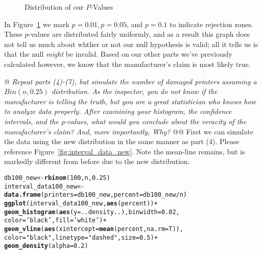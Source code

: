 \documentclass[10pt]{report}\usepackage[]{graphicx}\usepackage[]{xcolor}
\makeatletter
\newcommand{\hlnum}[1]{\textcolor[rgb]{0.686,0.059,0.569}{#1} }%
\newcommand{\hlstr}[1]{\textcolor[rgb]{0.192,0.494,0.8}{#1} }%
\newcommand{\hlopt}[1]{\textcolor[rgb]{0,0,0}{#1} }%
\newcommand{\hlstd}[1]{\textcolor[rgb]{0.345,0.345,0.345}{#1} }%
\newcommand{\hlkwb}[1]{\textcolor[rgb]{0.69,0.353,0.396}{#1} }%
\newcommand{\hlkwc}[1]{\textcolor[rgb]{0.333,0.667,0.333}{#1} }%
\newcommand{\hlkwd}[1]{\textcolor[rgb]{0.737,0.353,0.396}{\textbf{#1} } }%
\newenvironment{kframe}{%
 \def\at@end@of@kframe{}%
 \ifinner\ifhmode%
  \def\at@end@of@kframe{\end{minipage} }%
  \begin{minipage}{\columnwidth}%
 \fi\fi%
 \def\FrameCommand##1{\hskip\@totalleftmargin \hskip-\fboxsep
 \colorbox{shadecolor}{##1}\hskip-\fboxsep
     \hskip-\linewidth \hskip-\@totalleftmargin \hskip\columnwidth}%
 \MakeFramed {\advance\hsize-\width
   \@totalleftmargin\z@ \linewidth\hsize
   \@setminipage} }%
 {\par\unskip\endMakeFramed%
 \at@end@of@kframe}
\newenvironment{knitrout}{}{} %
\makeatother
\begin{document}
\begin{easylist}[enumerate]
\begin{knitrout}
\begin{figure}[H]
{}

\caption[Distribution of our $P$-Values]{Distribution of our $P$-Values\label{fig:pvalues} }
\end{figure}


\end{knitrout}


        In Figure~\ref{fig:pvalues} we mark $p=0.01, p=0.05$, and $p=0.1$ to indicate rejection zones. These $p$-values
        are distributed fairly uniformly, and as a result this graph does not tell us much about whther or not our null
        hypothesis is valid; all it tells us is that the null \textit{might} be invalid. Based on our other parts we've
        previously calculated however, we know that the manufacturer's claim is most likely true.

        \newpage
        @ \textit{Repeat parts (4)-(7), but simulate the number of damaged printers assuming a $Bin(n, 0.25)$
        distribution. As the inspector, you do not know if the manufacturer is telling the truth, but you are a great
        statistician who knows how to analyze data properly. After examining your histogram, the confidence intervals, and
        the p-values, what would you conclude about the veracity of the manufacturer's claim? And, more importantly,
        Why?}\newline
        @@ First we can simulate the data using the new distribution in the same manner as part (4). Please reference
        Figure~\ref{fig:interval_data_new}. Note the mean-line remains, but is markedly different from before due to the
        new distribution.

\begin{knitrout}
\color{fgcolor}\begin{kframe}
\begin{alltt}
         \hlstd{db100_new} \hlkwb{<-} \hlkwd{rbinom}\hlstd{(}\hlnum{100}\hlstd{, n,} \hlnum{0.25}\hlstd{)}
         \hlstd{interval_data100_new} \hlkwb{<-} \hlkwd{data.frame}\hlstd{(}\hlkwc{printers}\hlstd{=db100_new,} \hlkwc{percent}\hlstd{=db100_new}\hlopt{/}\hlstd{n)}
         \hlkwd{ggplot}\hlstd{(interval_data100_new,} \hlkwd{aes}\hlstd{(percent))} \hlopt{+}
                    \hlkwd{geom_histogram}\hlstd{(}\hlkwd{aes}\hlstd{(}\hlkwc{y}\hlstd{=..density..),} \hlkwc{binwidth}\hlstd{=}\hlnum{0.02}\hlstd{,}
                                   \hlkwc{color}\hlstd{=}\hlstr{'black'}\hlstd{,} \hlkwc{fill}\hlstd{=}\hlstr{'white'}\hlstd{)} \hlopt{+}
                    \hlkwd{geom_vline}\hlstd{(}\hlkwd{aes}\hlstd{(}\hlkwc{xintercept}\hlstd{=}\hlkwd{mean}\hlstd{(percent,} \hlkwc{na.rm}\hlstd{=T)),}
                               \hlkwc{color}\hlstd{=}\hlstr{"black"}\hlstd{,} \hlkwc{linetype}\hlstd{=}\hlstr{"dashed"}\hlstd{,} \hlkwc{size}\hlstd{=}\hlnum{0.5}\hlstd{)} \hlopt{+}
                    \hlkwd{geom_density}\hlstd{(}\hlkwc{alpha}\hlstd{=}\hlnum{0.2}\hlstd{)}
\end{alltt}
\end{kframe}\begin{figure}[H]



\end{figure}
\end{knitrout}
\end{easylist}
\end{document}
